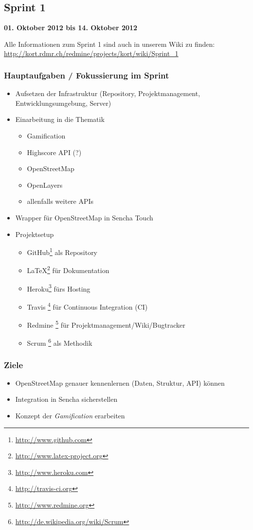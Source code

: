 \subsection{Sprint 1}

\textbf{01. Oktober 2012 bis 14. Oktober 2012}

Alle Informationen zum Sprint 1 sind auch in unserem Wiki zu finden:
\url{http://kort.rdmr.ch/redmine/projects/kort/wiki/Sprint_1}

\subsubsection{Hauptaufgaben / Fokussierung im Sprint}

\begin{itemize}
	\item Aufsetzen der Infrastruktur (Repository, Projektmanagement, Entwicklungsumgebung, Server)
	\item Einarbeitung in die Thematik
	\begin{itemize}
		\item Gamification
		\item Highscore API (?)
		\item OpenStreetMap
		\item OpenLayers
		\item allenfalls weitere \gls{API}s
	\end{itemize}
	\item Wrapper für OpenStreetMap in Sencha Touch
	\item Projektsetup
	\begin{itemize}
		\item GitHub\footnote{\url{http://www.github.com}} als Repository
		\item \LaTeX{}\footnote{\url{http://www.latex-project.org}} für Dokumentation
		\item Heroku\footnote{\url{http://www.heroku.com}} fürs Hosting
		\item Travis \footnote{\url{http://travis-ci.org}} für Continuous Integration (CI)
		\item Redmine \footnote{\url{http://www.redmine.org}} für Projektmanagement/Wiki/Bugtracker
		\item Scrum \footnote{\url{http://de.wikipedia.org/wiki/Scrum}} als Methodik
	\end{itemize}
\end{itemize}

\subsubsection{Ziele}
\begin{itemize}
	\item OpenStreetMap genauer kennenlernen (Daten, Struktur, API) können
	\item Integration in Sencha sicherstellen
	\item Konzept der \emph{Gamification} erarbeiten
\end{itemize}

